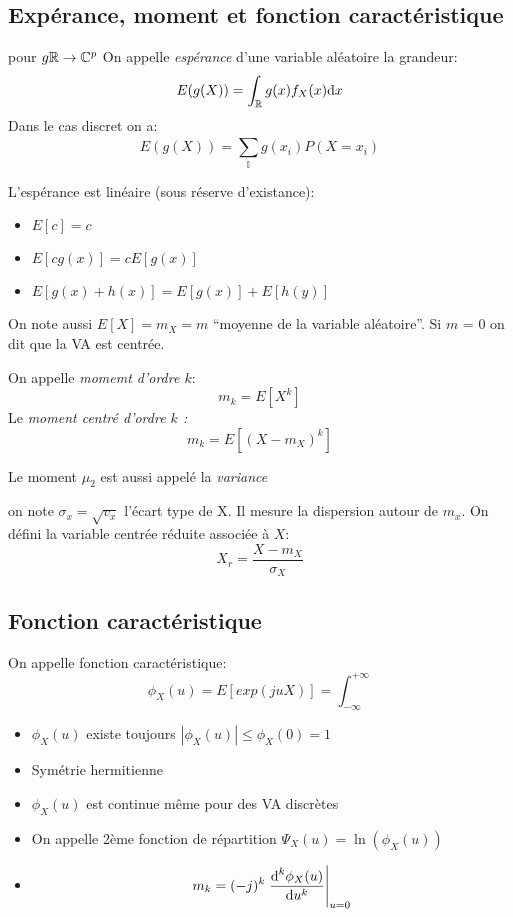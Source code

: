 \documentclass[main.tex]{subfiles}
\begin{document}
\subsection{Expérance, moment et fonction caractéristique}
\begin{defin}
  pour $g \R \to\C^p$
  On appelle \emph{espérance} d'une variable aléatoire la grandeur:
  \[
    E(g(X)) = \int_{\R}^{} g(x)f_X(x)\d x
  \]
Dans le cas discret on a:
\[
  E(g(X)) = \sum_{\mathbb{I}}^{}g(x_i)P(X=x_i)
\]
\end{defin}
\begin{prop}
  L'espérance est linéaire (sous réserve d'existance):
  \begin{itemize}
  \item $E[c]=c$
  \item $E[cg(x)]=cE[g(x)]$
  \item $E[g(x)+h(x)] =E[g(x)]+E[h(y)]$
  \end{itemize}
\end{prop}
\begin{rem}
  On note aussi $E[X]=m_X = m$ ``moyenne de la variable aléatoire''. Si $m$ = 0 on dit que la VA est centrée.
\end{rem}

\begin{defin}
  On appelle \emph{momemt d'ordre $k$}:
  \[
    m_k = E[X^k]
  \]
Le \emph{moment centré d'ordre $k$ :}
  \[
    m_k = E[(X-m_X)^k]
  \]

Le moment $\mu_2$ est aussi appelé la \emph{variance}
\end{defin}
\begin{rem}
  on note $\sigma_x = \sqrt{v_x}$ l'écart type de X. Il mesure la dispersion autour de $m_x$.
On défini la variable centrée réduite associée à $X$:
\[
  X_r = \frac{X-m_X}{\sigma_X}
\]
\end{rem}
\subsection{Fonction caractéristique}

\begin{defin}
  On appelle fonction caractéristique:
\[
  \phi_X(u) = E[exp(juX)] = \int_{-\infty}^{+\infty}
\]
\end{defin}
\begin{prop}
  \begin{itemize}
  \item $\phi_X(u)$ existe toujours $|\phi_X(u)|\le\phi_X(0)=1$
  \item Symétrie hermitienne
  \item $\phi_X(u)$ est continue même pour des VA discrètes
  \item On appelle 2ème fonction de répartition $\Psi_X(u)=\ln(\phi_X(u))$
  \item \[
      m_k = (-j)^k\left.\deriv[^{k}\phi_X(u)]{u^k}\right|_{u=0}
    \]
  \end{itemize}
\end{prop}
\end{document}
